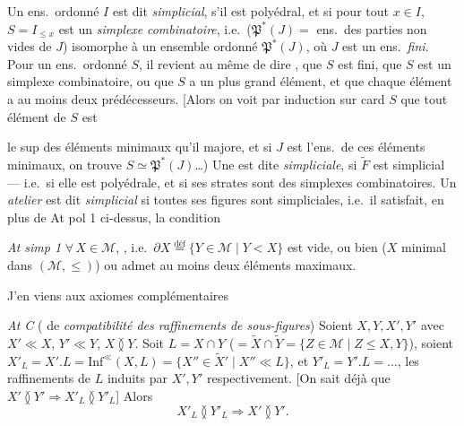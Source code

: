 \documentclass[11pt,a4paper]{article}
\begin{document}
Un ens.\ ordonné $I$ est dit \emph{simplicial}, s'il est polyédral, et si pour tout $x \in I$, $S = I_{\leq x}$ est un \emph{simplexe} \emph{combinatoire}, i.e.\ ($\mathfrak{P}^{*}(J) =$ ens.\ des parties non vides de $J$) \ill{} isomorphe à un ensemble ordonné $\mathfrak{P}^{*}(J)$, où $J$ est un ens.\ \emph{fini}. Pour un ens.\ ordonné $S$, il revient au même de dire , que $S$ est fini, que $S$ est un simplexe combinatoire, ou que $S$ a un plus grand élément, et que chaque élément  a au moins deux prédécesseurs. [Alors on voit par induction sur card $S$ que tout élément de $S$ est

le sup  des éléments minimaux qu'il majore, et si $J$ est l'ens.\ de ces éléments minimaux, on trouve $S \simeq \mathfrak{P}^{*}(J)$…) Une   est dite  \emph{simpliciale}, si $\widetilde{F}$ est simplicial — i.e.\ si elle est polyédrale, et si ses strates sont des simplexes combinatoires. Un \emph{atelier} est dit  \emph{simplicial} si toutes ses figures sont simpliciales, i.e.\ il satisfait, en plus de At pol 1 ci-dessus, la condition

\emph{At simp 1} \quad $\forall\, X \in \mathcal{M}$,  , i.e.\ $\partial X \overset{\mathrm{déf}}{=} \lbrace Y \in \mathcal{M} \mid Y < X \rbrace$ est vide, ou bien ($X$ minimal dans $(\mathcal{M}, \leq)$) ou admet au moins deux éléments maximaux.

J'en viens aux axiomes complémentaires

\emph{At C} (  de \emph{compatibilité des raffinements de sous-figures}) Soient $X, Y, X', Y'$  avec $X' \ll X$, $Y' \ll Y$, $X \between Y$. Soit $L = X \cap Y$ ($= \widetilde{X} \cap \widetilde{Y} = \lbrace Z \in \mathcal{M} \mid Z \leq X, Y \rbrace$), soient $X'_{L} = X'.L = \mathrm{Inf}^{\ll}(X, L) = \lbrace X'' \in \widetilde{X}' \mid X'' \ll L \rbrace$, et $Y'_{L} = Y'.L = \dots$, les raffinements de $L$ induits par $X', Y'$ respectivement.  [On sait déjà que $X' \between Y' \Rightarrow X'_{L} \between Y'_{L}$] Alors
\[
  X'_{L} \between Y'_{L} \Longrightarrow X' \between Y' .
\]
\end{document}
